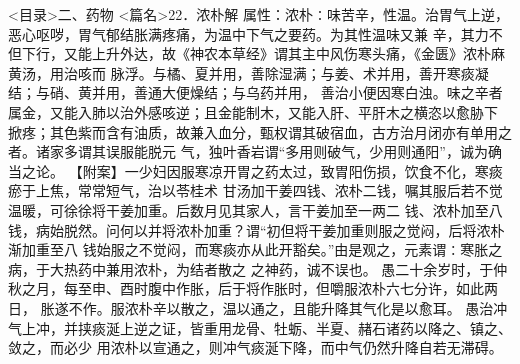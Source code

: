 \documentclass[a4paper,12pt,UTF8,twoside]{ctexbook}
\begin{document}
<目录>二、药物
<篇名>22．浓朴解
属性：浓朴∶味苦辛，性温。治胃气上逆，恶心呕哕，胃气郁结胀满疼痛，为温中下气之要药。为其性温味又兼 
辛，其力不但下行，又能上升外达，故《神农本草经》谓其主中风伤寒头痛，《金匮》浓朴麻黄汤，用治咳而 
脉浮。与橘、夏并用，善除湿满；与姜、术并用，善开寒痰凝结；与硝、黄并用，善通大便燥结；与乌药并用， 
善治小便因寒白浊。味之辛者属金，又能入肺以治外感咳逆；且金能制木，又能入肝、平肝木之横恣以愈胁下 
掀疼；其色紫而含有油质，故兼入血分，甄权谓其破宿血，古方治月闭亦有单用之者。诸家多谓其误服能脱元 
气，独叶香岩谓“多用则破气，少用则通阳”，诚为确当之论。 
【附案】一少妇因服寒凉开胃之药太过，致胃阳伤损，饮食不化，寒痰瘀于上焦，常常短气，治以苓桂术 
甘汤加干姜四钱、浓朴二钱，嘱其服后若不觉温暖，可徐徐将干姜加重。后数月见其家人，言干姜加至一两二 
钱、浓朴加至八钱，病始脱然。问何以并将浓朴加重？谓“初但将干姜加重则服之觉闷，后将浓朴渐加重至八 
钱始服之不觉闷，而寒痰亦从此开豁矣。”由是观之，元素谓∶寒胀之病，于大热药中兼用浓朴，为结者散之 
之神药，诚不误也。 
愚二十余岁时，于仲秋之月，每至申、酉时腹中作胀，后于将作胀时，但嚼服浓朴六七分许，如此两日， 
胀遂不作。服浓朴辛以散之，温以通之，且能升降其气化是以愈耳。 
愚治冲气上冲，并挟痰涎上逆之证，皆重用龙骨、牡蛎、半夏、赭石诸药以降之、镇之、敛之，而必少 
用浓朴以宣通之，则冲气痰涎下降，而中气仍然升降自若无滞碍。 
\end{document}
